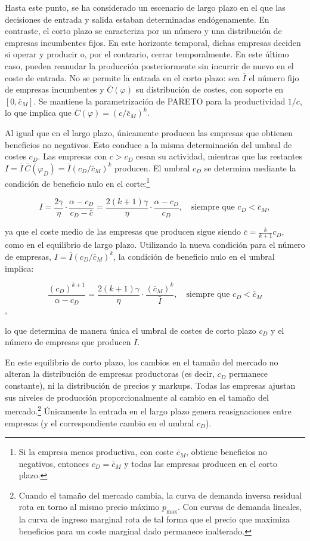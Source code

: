 \documentclass[10pt,a4paper]{article}
\begin{document}
Hasta este punto, se ha considerado un escenario de largo plazo en el que las decisiones de entrada y salida estaban determinadas endógenamente. En contraste, el corto plazo se caracteriza por un número y una distribución de empresas incumbentes fijos. En este horizonte temporal, dichas empresas deciden si operar y producir o, por el contrario, cerrar temporalmente. En este último caso, pueden reanudar la producción posteriormente sin incurrir de nuevo en el coste de entrada. No se permite la entrada en el corto plazo: sea $\bar{I}$ el número fijo de empresas incumbentes y $\bar{C}(\varphi)$ su distribución de costes, con soporte en $[0, \bar{c}_M]$. Se mantiene la parametrización de PARETO para la productividad $1/c$, lo que implica que $\bar{C}(\varphi) = (c/\bar{c}_M)^k$. 

Al igual que en el largo plazo, únicamente producen las empresas que obtienen beneficios no negativos. Esto conduce a la misma determinación del umbral de costes $c_D$. Las empresas con $c > c_D$ cesan su actividad, mientras que las restantes $I = \bar{I}\,\bar{C}(\varphi_D) = \bar{I}(c_D/\bar{c}_M)^k$ producen. El umbral $c_D$ se determina mediante la condición de beneficio nulo en el corte:\footnote{%
    Si la empresa menos productiva, con coste $\bar{c}_M$, obtiene beneficios no negativos, entonces $c_D = \bar{c}_M$ y todas las empresas producen en el corto plazo.
}

$$I = \frac{2\gamma}{\eta}\cdot \frac{\alpha - c_D}{c_D - \bar{c}} = \frac{2(k+1)\gamma}{\eta}\cdot \frac{\alpha - c_D}{c_D}, \quad \text{siempre que } c_D < \bar{c}_M,$$

ya que el coste medio de las empresas que producen sigue siendo $\bar{c} = \frac{k}{k+1}c_D$, como en el equilibrio de largo plazo. Utilizando la nueva condición para el número de empresas, $I = \bar{I}(c_D/\bar{c}_M)^k$, la condición de beneficio nulo en el umbral implica:

$$\frac{(c_D)^{k+1}}{\alpha - c_D} = \frac{2(k+1)\gamma}{\eta}\cdot \frac{(\bar{c}_M)^k}{\bar{I}}, \quad \text{siempre que } c_D < \bar{c}_M$$,

lo que determina de manera única el umbral de costes de corto plazo $c_D$ y el número de empresas que producen $I$.

En este equilibrio de corto plazo, los cambios en el tamaño del mercado no alteran la distribución de empresas productoras (es decir, $c_D$ permanece constante), ni la distribución de precios y markups. Todas las empresas ajustan sus niveles de producción proporcionalmente al cambio en el tamaño del mercado.\footnote{%
    Cuando el tamaño del mercado cambia, la curva de demanda inversa residual rota en torno al mismo precio máximo $p_{\max}$. Con curvas de demanda lineales, la curva de ingreso marginal rota de tal forma que el precio que maximiza beneficios para un coste marginal dado permanece inalterado.
} Únicamente la entrada en el largo plazo genera reasignaciones entre empresas (y el correspondiente cambio en el umbral $c_D$).
\end{document}
